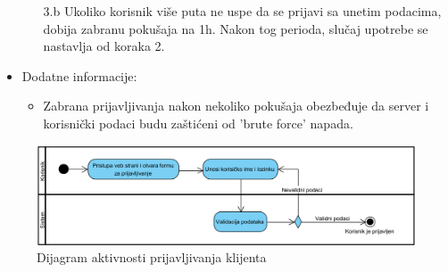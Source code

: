 \begin{itemize}
\begin{itemize}
            \item[3.b] Ukoliko korisnik više puta ne uspe da se prijavi sa unetim podacima, dobija zabranu pokušaja na 1h. Nakon tog perioda, slučaj upotrebe se nastavlja od koraka 2.
        \end{itemize}
    \item Dodatne informacije:
        \begin{itemize}
            \item Zabrana prijavljivanja nakon nekoliko pokušaja obezbeđuje da server i korisnički podaci budu zaštićeni od 'brute force' napada.
        \end{itemize}
\end{itemize}

\begin{figure}[H]
\begin{center}
\includegraphics[width=\textwidth]{Pictures/activity_user_login.png}
\end{center}
    \caption{Dijagram aktivnosti prijavljivanja klijenta}
\label{fig:ActivitySelectMealPlan}
\end{figure}